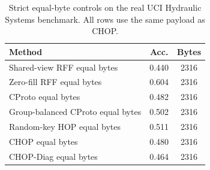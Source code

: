 \begin{table}[t]
\centering
\caption{Strict equal-byte controls on the real UCI Hydraulic Systems benchmark. All rows use the same payload as CHOP.}
\label{tab:strict-equal-byte-hydraulic}
\begin{tabular}{lcc}
\toprule
Method & Acc. & Bytes \\
\midrule
Shared-view RFF equal bytes & 0.440 & 2316 \\
Zero-fill RFF equal bytes & 0.604 & 2316 \\
CProto equal bytes & 0.482 & 2316 \\
Group-balanced CProto equal bytes & 0.502 & 2316 \\
Random-key HOP equal bytes & 0.511 & 2316 \\
CHOP equal bytes & 0.480 & 2316 \\
CHOP-Diag equal bytes & 0.464 & 2316 \\
\bottomrule
\end{tabular}
\end{table}
